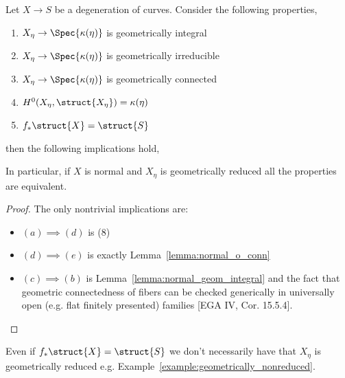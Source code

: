 \documentclass[12pt]{article}
\begin{document}
\begin{prop}
Let $X \to S$ be a degeneration of curves. Consider the following properties,
\begin{enumerate}
\item $X_\eta \to \Spec{\kappa(\eta)}$ is geometrically integral

\item $X_\eta \to \Spec{\kappa(\eta)}$ is geometrically irreducible

\item $X_\eta \to \Spec{\kappa(\eta)}$ is geometrically connected

\item $H^0(X_\eta, \struct{X_\eta}) = \kappa(\eta)$

\item $f_* \struct{X} = \struct{S}$
\end{enumerate}
then the following implications hold,
\begin{center}
\end{center}
In particular, if $X$ is normal and $X_\eta$ is geometrically reduced all the properties are equivalent.
\end{prop}

\begin{proof}
The only nontrivial implications are:
\begin{itemize}
\item $(a) \implies (d)$ is  (8)
\item $(d) \implies (e)$ is exactly Lemma~\ref{lemma:normal_o_conn}
\item $(c) \implies (b)$ is Lemma~\ref{lemma:normal_geom_integral} and the fact that geometric connectedness of fibers can be checked generically in universally open (e.g. flat finitely presented) families [EGA IV, Cor. 15.5.4].
\end{itemize} 
\end{proof}

\begin{rmk}
Even if $f_* \struct{X} = \struct{S}$ we don't necessarily have that $X_\eta$ is geometrically reduced e.g. Example~\ref{example:geometrically_nonreduced}.
\end{rmk}
\end{document}
